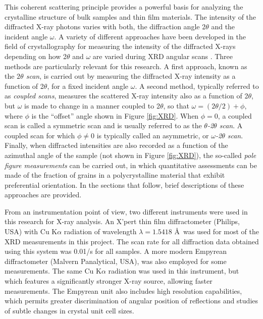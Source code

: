 This coherent scattering principle provides a powerful basis for analyzing the crystalline structure of bulk samples and thin film materials. The intensity of the diffracted X-ray photons varies with both, the diffraction angle 2$\theta$ and the incident angle $\omega$. A variety of different approaches have been developed in the field of crystallography for measuring the intensity of the diffracted X-rays depending on how 2$\theta$ and $\omega$ are varied during XRD angular scans \cite{Cullity2001}. Three methods are particularly relevant for this research. A first approach, known as the \emph{$2\theta$ scan}, is carried out by measuring the diffracted X-ray intensity as a function of 2$\theta$, for a fixed incident angle $\omega$. A second method, typically referred to as \emph{coupled scans}, measures the scattered X-ray intensity also as a function of 2$\theta$, but $\omega$ is made to change in a manner coupled to 2$\theta$, so that $\omega = (2\theta/2) + \phi$, where $\phi$ is the ``offset'' angle shown in Figure \ref{fig:XRD}. When $\phi=0$, a coupled scan is called a symmetric scan and is usually referred to as the \emph{$\theta$-2$\theta$ scan}. A coupled scan for which $\phi \neq 0$ is typically called an asymmetric, or \emph{$\omega$-2$\theta$ scan}. Finally, when diffracted intensities are also recorded as a function of the azimuthal angle of the sample (not shown in Figure \ref{fig:XRD}), the so-called \emph{pole figure measurements} can be carried out, in which quantitative assessments can be made of the fraction of grains in a polycrystalline material that exhibit preferential orientation. In the sections that follow, brief descriptions of these approaches are provided.

From an instrumentation point of view, two different instruments were used in this research for X-ray analysis. An X’pert thin film diffractometer (Philips, USA) with Cu K$\alpha$ radiation of wavelength $\lambda= 1.5418$ \AA\ was used for most of the XRD measurements in this project. The scan rate for all diffraction data obtained using this system was 0.01\textdegree/s for all samples. A more modern Empyrean diffractometer (Malvern Panalytical, USA), was also employed for some measurements. The same Cu K$\alpha$ radiation was used in this instrument, but which features a significantly stronger X-ray source, allowing faster measurements. The Empyrean unit also includes high resolution capabilities, which permits greater discrimination of angular position of reflections and studies of subtle changes in crystal unit cell sizes.   

